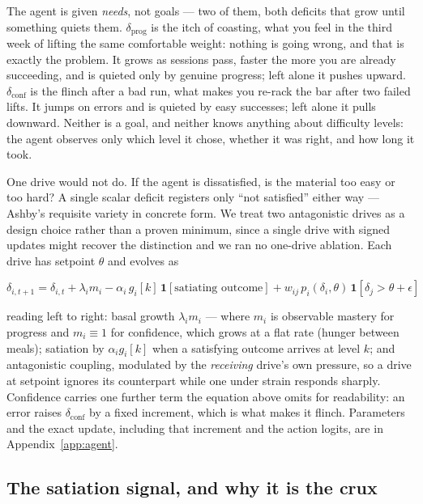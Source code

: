 \documentclass{article}
\begin{document}
The agent is given \emph{needs}, not goals --- two of them, both deficits that grow until something quiets them. $\delta_{\text{prog}}$ is the itch of coasting, what you feel in the third week of lifting the same comfortable weight: nothing is going wrong, and that is exactly the problem. It grows as sessions pass, faster the more you are already succeeding, and is quieted only by genuine progress; left alone it pushes upward. $\delta_{\text{conf}}$ is the flinch after a bad run, what makes you re-rack the bar after two failed lifts. It jumps on errors and is quieted by easy successes; left alone it pulls downward. Neither is a goal, and neither knows anything about difficulty levels: the agent observes only which level it chose, whether it was right, and how long it took.

One drive would not do. If the agent is dissatisfied, is the material too easy or too hard? A single scalar deficit registers only ``not satisfied'' either way --- Ashby's requisite variety in concrete form. We treat two antagonistic drives as a design choice rather than a proven minimum, since a single drive with signed updates might recover the distinction and we ran no one-drive ablation. Each drive has setpoint $\theta$ and evolves as

\begin{equation}
\delta_{i,t+1} = \delta_{i,t} + \lambda_i m_i - \alpha_i\, g_i[k]\, \mathbf{1}[\text{satiating outcome}] + w_{ij}\, p_i(\delta_i,\theta)\, \mathbf{1}[\delta_j > \theta + \epsilon]
\end{equation}

reading left to right: basal growth $\lambda_i m_i$ --- where $m_i$ is observable mastery for progress and $m_i{\equiv}1$ for confidence, which grows at a flat rate (hunger between meals); satiation by $\alpha_i g_i[k]$ when a satisfying outcome arrives at level $k$; and antagonistic coupling, modulated by the \emph{receiving} drive's own pressure, so a drive at setpoint ignores its counterpart while one under strain responds sharply. Confidence carries one further term the equation above omits for readability: an error raises $\delta_{\text{conf}}$ by a fixed increment, which is what makes it flinch. Parameters and the exact update, including that increment and the action logits, are in Appendix~\ref{app:agent}.

\subsection{The satiation signal, and why it is the crux}
\end{document}
